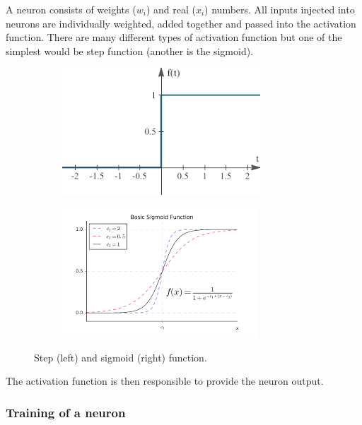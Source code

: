 \documentclass[11pt]{article}
\begin{document}
A neuron consists of weights (\(w_i\)) and real (\(x_i\)) numbers. All
inputs injected into neurons are individually weighted, added together
and passed into the activation function. There are many different types
of activation function but one of the simplest would be step function
(another is the sigmoid).

\begin{figure}
  \begin{subfigure}{0.5\textwidth}
    \centering
    \includegraphics[width=0.9\linewidth]{step_function.png}
  \end{subfigure}
  \begin{subfigure}{0.5\textwidth}
    \centering
    \includegraphics[width=0.9\linewidth]{sigmoid.png}
  \end{subfigure}
  \caption{Step (left) and sigmoid (right) function.}
\end{figure}
The activation function is then responsible to provide the neuron
output.

\hypertarget{training-of-a-neuron}{%
\subsubsection{Training of a neuron}\label{training-of-a-neuron}}
\end{document}
